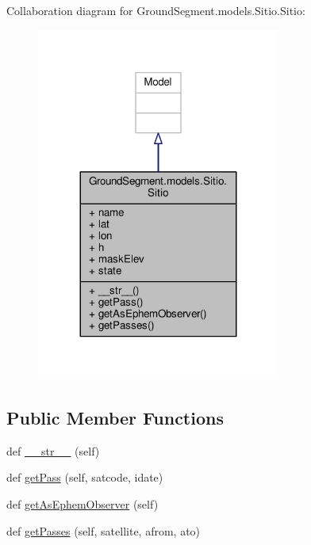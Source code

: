 Collaboration diagram for Ground\+Segment.\+models.\+Sitio.\+Sitio\+:\nopagebreak
\begin{figure}[H]
\begin{center}
\leavevmode
\includegraphics[width=227pt]{class_ground_segment_1_1models_1_1_sitio_1_1_sitio__coll__graph}
\end{center}
\end{figure}
\subsection*{Public Member Functions}
\begin{DoxyCompactItemize}
\item 
def \hyperlink{class_ground_segment_1_1models_1_1_sitio_1_1_sitio_a76b0e7facd2de38df048e845ebd100ae}{\+\_\+\+\_\+str\+\_\+\+\_\+} (self)
\item 
def \hyperlink{class_ground_segment_1_1models_1_1_sitio_1_1_sitio_a7064b2318b27416ccbe44acfb96a5c32}{get\+Pass} (self, satcode, idate)
\item 
def \hyperlink{class_ground_segment_1_1models_1_1_sitio_1_1_sitio_ac23a61be5e990c70e7ffe19ac108d1ca}{get\+As\+Ephem\+Observer} (self)
\item 
def \hyperlink{class_ground_segment_1_1models_1_1_sitio_1_1_sitio_adcc0813ee9504959117d74eb68ff8a80}{get\+Passes} (self, satellite, afrom, ato)
\end{DoxyCompactItemize}
